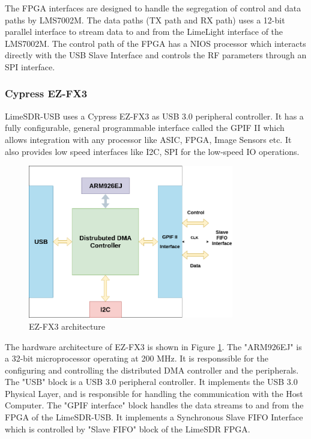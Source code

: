 The \ac{FPGA} interfaces are designed to handle the segregation of control and data paths by LMS7002M.
The data paths (TX path and RX path) uses a 12-bit parallel interface to stream data to and from the LimeLight interface of the LMS7002M.
The control path of the \ac{FPGA} has a NIOS processor which interacts directly with the USB Slave Interface and controls the \ac{RF} parameters through an \ac{SPI} interface.\\



\subsubsection{Cypress EZ-FX3}
LimeSDR-USB uses a Cypress EZ-FX3 \cite{noauthor_ez-usb_nodate} as \ac{USB} 3.0 peripheral controller.
It has a fully configurable, general programmable interface called the \ac{GPIF} II which allows integration with any processor like \ac{ASIC}, \ac{FPGA}, Image Sensors etc.
It also provides low speed interfaces like \ac{I2C}, \ac{SPI} for the low-speed \ac{IO} operations.\\

\begin{figure}[h!]
\centering
\hspace*{2.5cm}\includegraphics[width=0.8\textwidth]{Figure/FX3.png}
\caption{EZ-FX3 architecture}
\label{FX3_arch}
\end{figure}
The hardware architecture of EZ-FX3 is shown in Figure \ref{FX3_arch}.
The "ARM926EJ" is a 32-bit microprocessor operating at 200 MHz.
It is responssible for the configuring and controlling the distributed \ac{DMA} controller and the peripherals.
The "USB" block is a \ac{USB} 3.0 peripheral controller.
It implements the \ac{USB} 3.0 Physical Layer, and is responsible for handling the communication with the Host Computer.
The "\ac{GPIF} interface" block handles the data streams to and from the \ac{FPGA} of the LimeSDR-USB. 
It implements a Synchronous Slave FIFO Interface which is controlled by "Slave FIFO" block of the LimeSDR \ac{FPGA}.\\

